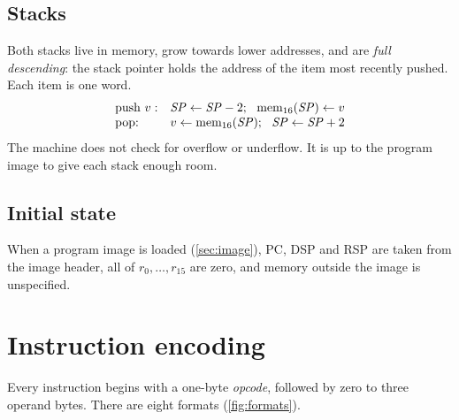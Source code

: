 \documentclass[11pt,a4paper]{article}
\newcommand{\mw}{\mathrm{mem}_{16}}
\newcommand{\R}[1]{r_{#1}}
\begin{document}
\subsection{Stacks}

Both stacks live in memory, grow towards lower addresses, and are \emph{full
descending}: the stack pointer holds the address of the item most recently
pushed. Each item is one word.
\[
\begin{array}{@{}ll@{}}
\text{push } v: & \mathit{SP} \gets \mathit{SP}-2;\ \ \mw(\mathit{SP}) \gets v\\
\text{pop:} & v \gets \mw(\mathit{SP});\ \ \mathit{SP} \gets \mathit{SP}+2
\end{array}
\]
The machine does not check for overflow or underflow. It is up to the program
image to give each stack enough room.

\subsection{Initial state}

When a program image is loaded (\cref{sec:image}), PC, DSP and RSP are taken
from the image header, all of $\R{0},\dots,\R{15}$ are zero, and memory outside the image
is unspecified.

\section{Instruction encoding}\label{sec:encoding}

Every instruction begins with a one-byte \emph{opcode}, followed by zero to
three operand bytes. There are eight formats (\cref{fig:formats}).
\end{document}
